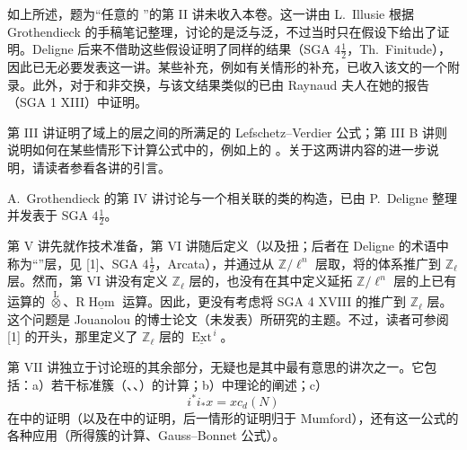 如上所述，题为“任意的 ”的第 II 讲未收入本卷。这一讲由 L.~Illusie 根据 Grothendieck 的手稿笔记整理，讨论的是泛与泛，不过当时只在假设下给出了证明。Deligne 后来不借助这些假设证明了同样的结果（SGA $4\frac12$，Th.~Finitude），因此已无必要发表这一讲。某些补充，例如有关情形的补充，已收入该文的一个附录。此外，对于和非交换，与该文结果类似的已由 Raynaud 夫人在她的报告（SGA 1 XIII）中证明。

第 III 讲证明了域上的层之间的所满足的 Lefschetz--Verdier 公式；第 III B 讲则说明如何在某些情形下计算公式中的，例如上的 。关于这两讲内容的进一步说明，请读者参看各讲的引言。

A.~Grothendieck 的第 IV 讲讨论与一个相关联的类的构造，已由 P.~Deligne 整理并发表于 SGA $4\frac12$。

第 V 讲先就作技术准备，第 VI 讲随后定义（以及扭；后者在 Deligne 的术语中称为“”层，见 [1]、SGA $4\frac12$，Arcata），并通过从 $\mathbb Z/\ell^n$ 层取，将的体系推广到 $\mathbb Z_\ell$ 层。然而，第 VI 讲没有定义 $\mathbb Z_\ell$ 层的，也没有在其中定义延拓 $\mathbb Z/\ell^n$ 层的上已有运算的 $\mathbin{\overset{\mathrm L}{\otimes}}$、$\mathrm R\underline{\operatorname{Hom}}$ 运算。因此，更没有考虑将 SGA 4 XVIII 的推广到 $\mathbb Z_\ell$ 层。这个问题是 Jouanolou 的博士论文（未发表）所研究的主题。不过，读者可参阅 [1] 的开头，那里定义了 $\mathbb Z_\ell$ 层的 $\underline{\operatorname{Ext}}^{\,i}$。

第 VII 讲独立于讨论班的其余部分，无疑也是其中最有意思的讲次之一。它包括：a）若干标准簇（、、）的计算；b）中理论的阐述；c）
\[
 i^*i_*x=xc_d(N)
\]
在中的证明（以及在中的证明，后一情形的证明归于 Mumford），还有这一公式的各种应用（所得簇的计算、Gauss--Bonnet 公式）。

